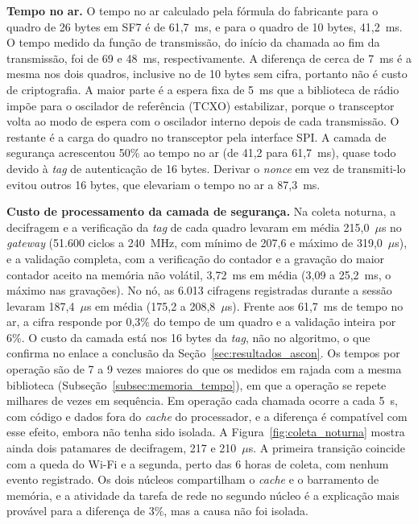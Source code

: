 \textbf{Tempo no ar.} O tempo no ar calculado pela fórmula do fabricante para o quadro de 26 bytes em SF7 é de 61,7~ms, e para o quadro de 10 bytes, 41,2~ms. O tempo medido da função de transmissão, do início da chamada ao fim da transmissão, foi de 69 e 48~ms, respectivamente. A diferença de cerca de 7~ms é a mesma nos dois quadros, inclusive no de 10 bytes sem cifra, portanto não é custo de criptografia. A maior parte é a espera fixa de 5~ms que a biblioteca de rádio impõe para o oscilador de referência (TCXO) estabilizar, porque o transceptor volta ao modo de espera com o oscilador interno depois de cada transmissão. O restante é a carga do quadro no transceptor pela interface SPI. A camada de segurança acrescentou 50\% ao tempo no ar (de 41,2 para 61,7~ms), quase todo devido à \textit{tag} de autenticação de 16 bytes. Derivar o \textit{nonce} em vez de transmiti-lo evitou outros 16 bytes, que elevariam o tempo no ar a 87,3~ms.

\textbf{Custo de processamento da camada de segurança.} Na coleta noturna, a decifragem e a verificação da \textit{tag} de cada quadro levaram em média 215,0~$\mu$s no \textit{gateway} (51.600 ciclos a 240~MHz, com mínimo de 207,6 e máximo de 319,0~$\mu$s), e a validação completa, com a verificação do contador e a gravação do maior contador aceito na memória não volátil, 3,72~ms em média (3,09 a 25,2~ms, o máximo nas gravações). No nó, as 6.013 cifragens registradas durante a sessão levaram 187,4~$\mu$s em média (175,2 a 208,8~$\mu$s). Frente aos 61,7~ms de tempo no ar, a cifra responde por 0,3\% do tempo de um quadro e a validação inteira por 6\%. O custo da camada está nos 16 bytes da \textit{tag}, não no algoritmo, o que confirma no enlace a conclusão da Seção~\ref{sec:resultados_ascon}. Os tempos por operação são de 7 a 9 vezes maiores do que os medidos em rajada com a mesma biblioteca (Subseção~\ref{subsec:memoria_tempo}), em que a operação se repete milhares de vezes em sequência. Em operação cada chamada ocorre a cada 5~s, com código e dados fora do \textit{cache} do processador, e a diferença é compatível com esse efeito, embora não tenha sido isolada. A Figura~\ref{fig:coleta_noturna} mostra ainda dois patamares de decifragem, 217 e 210~$\mu$s. A primeira transição coincide com a queda do Wi-Fi e a segunda, perto das 6 horas de coleta, com nenhum evento registrado. Os dois núcleos compartilham o \textit{cache} e o barramento de memória, e a atividade da tarefa de rede no segundo núcleo é a explicação mais provável para a diferença de 3\%, mas a causa não foi isolada.

